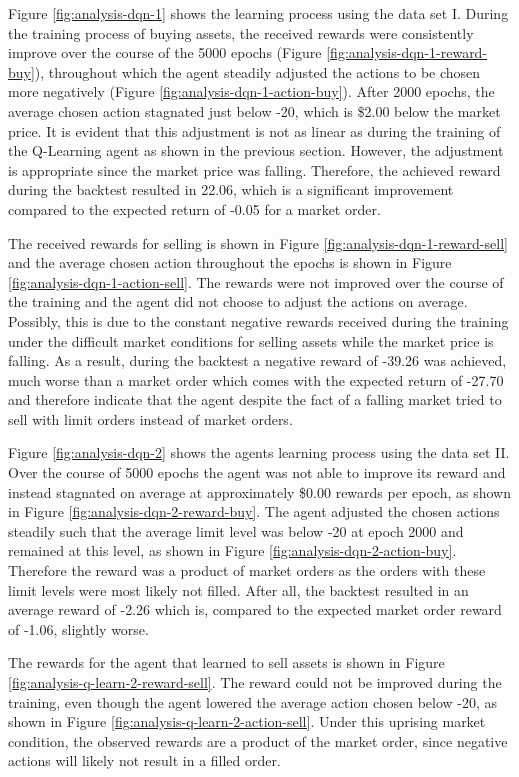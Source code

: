 Figure \ref{fig:analysis-dqn-1} shows the learning process using the data set I.
During the training process of buying assets, the received rewards were consistently improve over the course of the 5000 epochs (Figure \ref{fig:analysis-dqn-1-reward-buy}), throughout which the agent steadily adjusted the actions to be chosen more negatively (Figure \ref{fig:analysis-dqn-1-action-buy}).
After 2000 epochs, the average chosen action stagnated just below -20, which is \$2.00 below the market price.
It is evident that this adjustment is not as linear as during the training of the Q-Learning agent as shown in the previous section.
However, the adjustment is appropriate since the market price was falling.
Therefore, the achieved reward during the backtest resulted in 22.06, which is a significant improvement compared to the expected return of -0.05 for a market order.

The received rewards for selling is shown in Figure \ref{fig:analysis-dqn-1-reward-sell} and the average chosen action throughout the epochs is shown in Figure \ref{fig:analysis-dqn-1-action-sell}.
The rewards were not improved over the course of the training and the agent did not choose to adjust the actions on average.
Possibly, this is due to the constant negative rewards received during the training under the difficult market conditions for selling assets while the market price is falling.
As a result, during the backtest a negative reward of -39.26 was achieved, much worse than a market order which comes with the expected return of -27.70 and therefore indicate that the agent despite the fact of a falling market tried to sell with limit orders instead of market orders.

Figure \ref{fig:analysis-dqn-2} shows the agents learning process using the data set II.
Over the course of 5000 epochs the agent was not able to improve its reward and instead stagnated on average at approximately \$0.00 rewards per epoch, as shown in Figure \ref{fig:analysis-dqn-2-reward-buy}.
The agent adjusted the chosen actions steadily such that the average limit level was below -20 at epoch 2000 and remained at this level, as shown in Figure \ref{fig:analysis-dqn-2-action-buy}.
Therefore the reward was a product of market orders as the orders with these limit levels were most likely not filled.
After all, the backtest resulted in an average reward of -2.26 which is, compared to the expected market order reward of -1.06, slightly worse.

The rewards for the agent that learned to sell assets is shown in Figure \ref{fig:analysis-q-learn-2-reward-sell}.
The reward could not be improved during the training, even though the agent lowered the average action chosen below -20, as shown in Figure \ref{fig:analysis-q-learn-2-action-sell}.
Under this uprising market condition, the observed rewards are a product of the market order, since negative actions will likely not result in a filled order.

